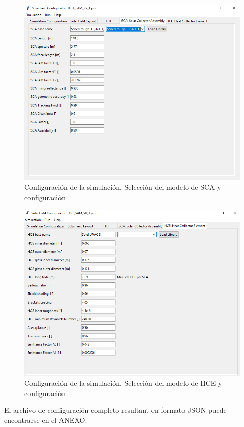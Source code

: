 \begin{figure}
\includegraphics[scale=0.8]{images/interface04.png}
\caption{Configuración de la simulación. Selección del modelo de SCA y configuración} 
\label{fig:interface04}
\end{figure}

\begin{figure}
\includegraphics[scale=0.8]{images/interface05.png}
\caption{Configuración de la simulación. Selección del modelo de HCE y configuración} 
\label{fig:interface05}
\end{figure}

El archivo de configuración completo resultant en formato JSON puede encontrarse en el ANEXO.

